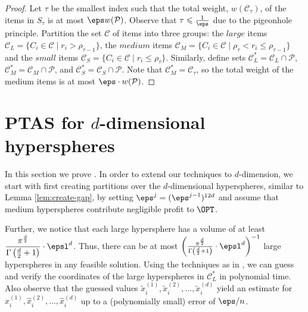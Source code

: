 \documentclass[10pt,a4paper]{article}
\theoremstyle{plain}
\theoremstyle{plain}
\theoremstyle{plain}
\theoremstyle{definition}
\begin{document}
{\begin{proof}
Let $\tau$ be the smallest index such that the total weight, $w(\mathcal{C}_{\tau})$, of the items in $S_{\tau}$ is at most $\eps w(\mathcal{P})$. Observe that $\tau \leqslant \frac{1}{\eps}$ due to the pigeonhole principle. Partition the set $\mathcal{C}$ of items into three groups: the $\textit{large}$ items $\mathcal{C}_L = \{C_{i} \in \mathcal{C} \mid r_{i}>\rho_{\tau-1}\}$, the $\textit{medium}$ items $\mathcal{C}_M = \{C_{i} \in \mathcal{C} \mid \rho_{\tau} < r_{i} \leqslant \rho_{\tau-1}\}$ and the $\textit{small}$ items $\mathcal{C}_S = \{C_{i} \in \mathcal{C} \mid r_{i} \leqslant \rho_{\tau}\}$. Similarly, define sets $\mathcal{C}_L^* = \mathcal{C}_L \cap \mathcal{P}$, $\mathcal{C}_M^* = \mathcal{C}_M \cap \mathcal{P}$, and $\mathcal{C}_S^* = \mathcal{C}_S \cap \mathcal{P}$. Note that $\mathcal{C}_M^* = \mathcal{C}_{\tau}$, so the total weight of the medium items is at most $\eps\cdot w(\mathcal{P})$.
\end{proof}


\section{\textsf{PTAS} for $d$-dimensional hyperspheres}
In this section we prove .
	In order to extend our techniques to \(d\)-dimension, we start with first creating partitions over the \(d\)-dimensional hyperspheres, similar to Lemma \ref{lem:create-gap},  by setting \(\eps^{j}=(\eps^{j-1})^{12d}\) and assume that medium hyperspheres contribute negligible profit to $\OPT$.
	
	Further, we notice that each large hypersphere has a volume of at least \( \dfrac{\pi^{\frac{d}{2}}}{\Gamma\left(\frac{d}{2} + 1\right)} \cdot \epsl^d
	\). Thus, there can be at most  \(\left(\frac{\pi^{\frac{d}{2}}}{\Gamma\left(\frac{d}{2} + 1\right)} \cdot \epsl^d\right)^{-1}\)  
 large hyperspheres in any feasible solution. Using the techniques as in , we can guess and verify the coordinates of the large hyperspheres in \(\mathcal{C}_{L}^*\) in polynomial time. Also observe that the guessed values $\tilde{x}_{i}^{(1)},\tilde{x}_{i}^{(2)},\dots,\tilde{x}_{i}^{(d)}$
	yield an estimate for $\hat{x}_{i}^{(1)},\hat{x}_{i}^{(2)},\dots,\hat{x}_{i}^{(d)}$ up to a (polynomially small) error of $\eps/n$.
	
}
\end{document}
